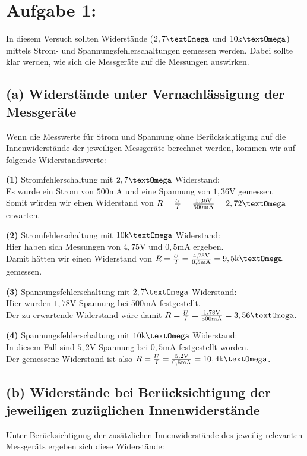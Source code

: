 \documentclass[]{article}
\newcommand{\unit}[1]{\text{#1}}
\begin{document}

\section*{Aufgabe 1:}
	In diesem Versuch sollten Widerstände ($2,7\unit{\textOmega}$ und $10\unit{k\textOmega}$) mittels Strom- und Spannungsfehlerschaltungen gemessen werden. Dabei sollte klar werden, wie sich die Messgeräte auf die Messungen auswirken.
\subsection*{(a) \normalfont Widerstände unter Vernachlässigung der Messgeräte}
	Wenn die Messwerte für Strom und Spannung ohne Berücksichtigung auf die Innenwiderstände der jeweiligen Messgeräte berechnet werden, kommen wir auf folgende Widerstandswerte:

	\textbf{(1)} Stromfehlerschaltung mit $2,7\unit{\textOmega}$ Widerstand:\\
	Es wurde ein Strom von $500\unit{mA}$ und eine Spannung von $1,36\unit{V}$ gemessen.\\ Somit würden wir einen Widerstand von $R = \frac{U}{I} = \frac{1,36\unit{V}}{500\unit{mA}} = 2,72\unit{\textOmega}$ erwarten.

	\textbf{(2)} Stromfehlerschaltung mit $10\unit{k\textOmega}$ Widerstand:\\
	Hier haben sich Messungen von $4,75\unit{V}$ und $0,5\unit{mA}$ ergeben.\\ Damit hätten wir einen Widerstand von $R = \frac{U}{I} = \frac{4,75\unit{V}}{0,5\unit{mA}} = 9,5\unit{k\textOmega}$ gemessen.

	\textbf{(3)} Spannungsfehlerschaltung mit $2,7\unit{\textOmega}$ Widerstand:\\
	Hier wurden $1,78\unit{V}$ Spannung bei $500\unit{mA}$ festgestellt.\\ Der zu erwartende Widerstand wäre damit $R = \frac{U}{I} = \frac{1,78\unit{V}}{500\unit{mA}} = 3,56\unit{\textOmega}$.

	\textbf{(4)} Spannungsfehlerschaltung mit $10\unit{k\textOmega}$ Widerstand:\\
	In diesem Fall sind $5,2\unit{V}$ Spannung bei $0,5\unit{mA}$ festgestellt worden.\\ Der gemessene Widerstand ist also $R = \frac{U}{I} = \frac{5,2\unit{V}}{0,5\unit{mA}} = 10,4\unit{k\textOmega}$.

\subsection*{(b) \normalfont Widerstände bei Berücksichtigung der jeweiligen zuzüglichen Innenwiderstände}
	Unter Berücksichtigung der zusätzlichen Innenwiderstände des jeweilig relevanten Messgeräts ergeben sich diese Widerstände:
\end{document}
